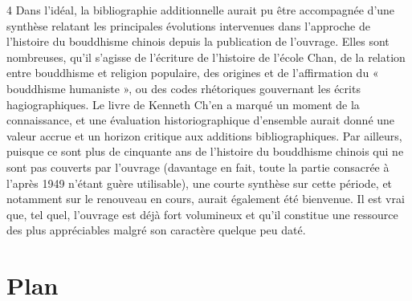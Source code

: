 4 Dans l’idéal, la bibliographie additionnelle aurait pu être accompagnée d’une synthèse relatant les principales évolutions intervenues dans l’approche de l’histoire du bouddhisme chinois depuis la publication de l’ouvrage. Elles sont nombreuses, qu’il s’agisse de l’écriture de l’histoire de l’école Chan, de la relation entre bouddhisme et religion populaire, des origines et de l’affirmation du « bouddhisme humaniste », ou des codes rhétoriques gouvernant les écrits hagiographiques. Le livre de Kenneth Ch’en a marqué un moment de la connaissance, et une évaluation historiographique d’ensemble aurait donné une valeur accrue et un horizon critique aux additions bibliographiques. Par ailleurs, puisque ce sont plus de cinquante ans de l’histoire du bouddhisme chinois qui ne sont pas couverts par l’ouvrage (davantage en fait, toute la partie consacrée à l’après 1949 n’étant guère utilisable), une courte synthèse sur cette période, et notamment sur le renouveau en cours, aurait également été bienvenue. Il est vrai que, tel quel, l’ouvrage est déjà fort volumineux et qu’il constitue une ressource des plus appréciables malgré son caractère quelque peu daté.

\section{Plan}

